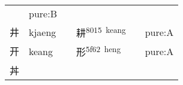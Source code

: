 \documentclass[14pt,a4paper]{scrartcl}
\begin{document}
\begin{longtable}[c]{@{}llllll@{}}
\begin{minipage}[t]{0.14\columnwidth}\raggedright\strut
\strut\end{minipage} &
\begin{minipage}[t]{0.14\columnwidth}\raggedright\strut
pure:B
\strut\end{minipage}\tabularnewline
\begin{minipage}[t]{0.14\columnwidth}\raggedright\strut
井
\strut\end{minipage} &
\begin{minipage}[t]{0.14\columnwidth}\raggedright\strut
kjaeng
\strut\end{minipage} &
\begin{minipage}[t]{0.14\columnwidth}\raggedright\strut
\strut\end{minipage} &
\begin{minipage}[t]{0.14\columnwidth}\raggedright\strut
耕\textsuperscript{8015~keang}
\strut\end{minipage} &
\begin{minipage}[t]{0.14\columnwidth}\raggedright\strut
\strut\end{minipage} &
\begin{minipage}[t]{0.14\columnwidth}\raggedright\strut
pure:A
\strut\end{minipage}\tabularnewline
\begin{minipage}[t]{0.14\columnwidth}\raggedright\strut
开
\strut\end{minipage} &
\begin{minipage}[t]{0.14\columnwidth}\raggedright\strut
keang
\strut\end{minipage} &
\begin{minipage}[t]{0.14\columnwidth}\raggedright\strut
\strut\end{minipage} &
\begin{minipage}[t]{0.14\columnwidth}\raggedright\strut
形\textsuperscript{5f62~heng}
\strut\end{minipage} &
\begin{minipage}[t]{0.14\columnwidth}\raggedright\strut
\strut\end{minipage} &
\begin{minipage}[t]{0.14\columnwidth}\raggedright\strut
pure:A
\strut\end{minipage}\tabularnewline
\begin{minipage}[t]{0.14\columnwidth}\raggedright\strut
丼
\strut\end{minipage} &
\begin{minipage}[t]{0.14\columnwidth}\raggedright\strut

\end{minipage}
\end{longtable}
\end{document}
